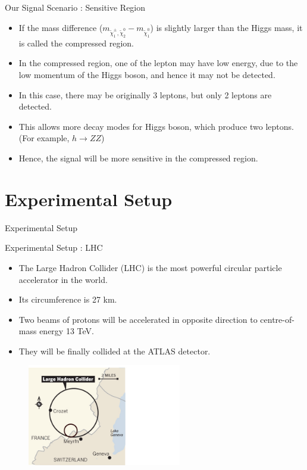 \documentclass[mathserif,serif]{beamer}
\begin{document}
\begin{frame}{Our Signal Scenario : Sensitive Region}
\begin{itemize}
\item If the mass difference ($m_{\tilde{\chi}_1^\pm , \tilde{\chi}_2^0} - m_{\tilde{\chi}_1^0}$) is slightly larger than the Higgs mass, it is called the compressed region.
\item In the compressed region, one of the lepton may have low energy, due to the low momentum of the Higgs boson, and hence it may not be detected.
\item In this case, there may be originally 3 leptons, but only 2 leptons are detected.
\item This allows more decay modes for Higgs boson, which produce two leptons. (For example, $h \rightarrow ZZ$)
\item Hence, the signal will be more sensitive in the compressed region.
\end{itemize}
\end{frame}

\section{Experimental Setup}
\begin{frame}
\begin{center}
\huge
Experimental Setup
\end{center}
\end{frame}

\begin{frame}{Experimental Setup : LHC}
\begin{itemize}
\item The Large Hadron Collider (LHC) is the most powerful circular particle accelerator in the world.
\item Its circumference is 27 km.
\item Two beams of protons will be accelerated in opposite direction to centre-of-mass energy 13 TeV.
\item They will be finally collided at the ATLAS detector.
\end{itemize}
\begin{figure}
\centering
\includegraphics[width=0.6\textwidth]{data/photo/detector/LHC.jpg}
\end{figure}
\end{frame}
\end{document}
